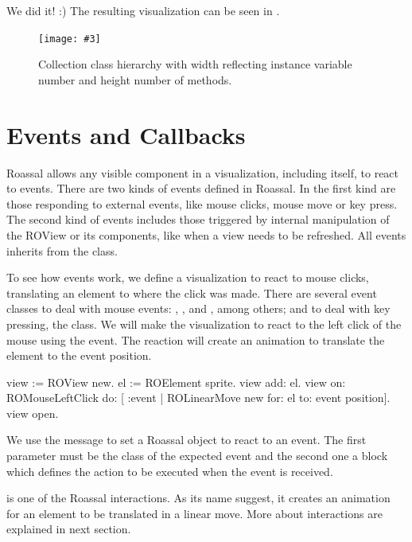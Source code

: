 \documentclass[a4paper,10pt,twoside]{book}
\newcommand{\fig}[4]{
		\begin{figure}[#1]
			\centering
			\texttt{[image: \#3]}
			\caption{\label{fig:#3}#4}
		\end{figure}}
\begin{document}
We did it! :)  The resulting visualization can be seen in .

\fig{H}{0.4}{collectionHierarchy}{Collection class hierarchy with width reflecting instance variable number and height number of methods.}


\section{Events and Callbacks}

Roassal allows any visible component in a visualization, including itself, to react to events. There are two kinds of events defined in Roassal. In the first kind are those responding to external events, like mouse clicks, mouse move or key press. The second kind of events includes those triggered by internal manipulation of the ROView or its components, like when a view needs to be refreshed. All events inherits from the  class.

To see how events work, we define a visualization to react to mouse clicks, translating an element to where the click was made. 
There are several event classes to deal with mouse events: , ,  and , among others; and to deal with key pressing, the  class.
We will make the visualization to react to the left click of the mouse using the  event. The reaction will create an animation to translate the element to the event position.


\begin{code}{}
view := ROView new.
el := ROElement sprite.
view add: el.
view 
	on: ROMouseLeftClick 
	do: [ :event | 
	        ROLinearMove new	for: el to: event position].
view open. 
\end{code}

We use the  message to set a Roassal object to react to an event. The first parameter must be the class of the expected event and the second one a block which defines the action to be executed when the event is received.

 is one of the Roassal interactions. As its name suggest, it creates an animation for an element to be translated in a linear move. More about interactions are explained in next section.

%
\end{document}
